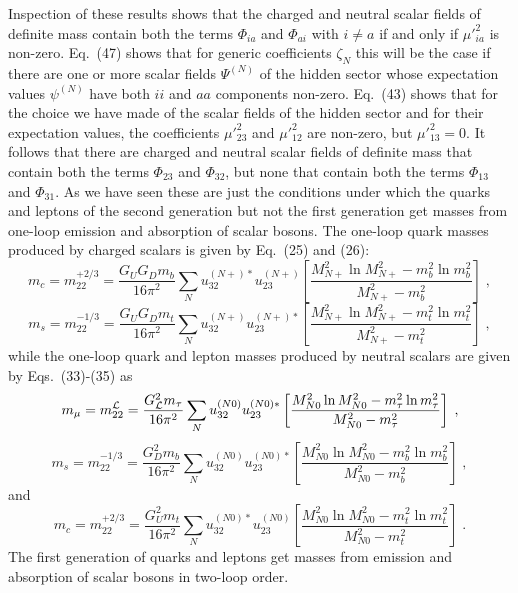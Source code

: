 Inspection of these results shows that the charged and neutral scalar fields of definite mass contain both the terms $\Phi_{ia}$ and $\Phi_{ai}$ with $i\neq a$ if and only if $\mu'^2_{ia}$ is non-zero.  Eq.~(47) shows that for generic coefficients $\zeta_N$ this will be the case if there are one or more scalar fields $\Psi^{(N)}$ of the hidden sector whose expectation values $\psi^{(N)}$ have both $ii$ and $aa$ components non-zero.   
Eq.~(43) shows that for the choice we have made of the scalar fields of the hidden sector and for their expectation values, the coefficients $\mu'^2_{23}$ and $\mu'^2_{12}$ are non-zero, but $\mu'^2_{13}=0$.  It follows that there are  charged and neutral scalar fields of definite mass that contain both the terms $\Phi_{23}$ and $\Phi_{32}$, but none that contain both the terms $\Phi_{13}$ and $\Phi_{31}$.    As we have seen these are just the conditions  under which the quarks and leptons of the second generation but not the first generation get masses from one-loop emission and absorption of scalar bosons.  The one-loop  quark masses produced by charged scalars is given by Eq.~(25) and (26):
\begin{equation}
m_c=m^{+2/3}_{22}=\frac{G_UG_Dm_b}{16\pi^2}\sum_{N}  u_{32}^{(N+)*}u_{23}^{(N+)}\left[\frac{M_{N+}^2\ln M_{N+}^2-m_b^2\ln m_b^2}{M_{N+}^2-m_b^2}
\right] \;,
\end{equation}
\begin{equation}
m_s=m^{-1/3}_{22}=\frac{G_UG_Dm_t}{16 \pi^2}\sum_{N}  u_{32}^{(N+)}u_{23}^{(N+)*}\left[\frac{M_{N+}^2\ln M_{N+}^2-m_t^2\ln m_t^2}{M_{N+}^2-m_t^2}\right]
 \;,
\end{equation}
while the one-loop quark and lepton masses produced by neutral scalars are given by Eqs.~(33)-(35) as
\begin{equation}
m_\mu=m^{\cal L}_{22}=\frac{G_{\cal L}^2m_\tau }{16 \pi^2}\sum_{N}  u_{32}^{(N0)}u_{23}^{(N0)*}\left[\frac{M_{N0}^2\ln M_{N0}^2-m_\tau^2\ln m_\tau^2}{M_{N0}^2-m_\tau^2}\right]
 \;,
\end{equation}
\begin{equation}
m_s=m^{-1/3}_{22}=\frac{G^2_Dm_b}{16 \pi^2}\sum_{N}  u_{32}^{(N0)}u_{23}^{(N0)*}\left[\frac{M_{N0}^2\ln M_{N0}^2-m_b^2\ln m_b^2}{M_{N0}^2-m_b^2}\right]
 \;,
\end{equation}
and
\begin{equation}
m_c=m^{+2/3}_{22}=\frac{G_U^2m_t}{16 \pi^2}\sum_{N}  u_{32}^{(N0)*}u_{23}^{(N0)}\left[\frac{M_{N0}^2\ln M_{N0}^2-m_t^2\ln m_t^2}{M_{N0}^2-m_t^2}\right]
 \;.
\end{equation}
The first generation of quarks and leptons get masses from emission and absorption of scalar bosons in two-loop order.

